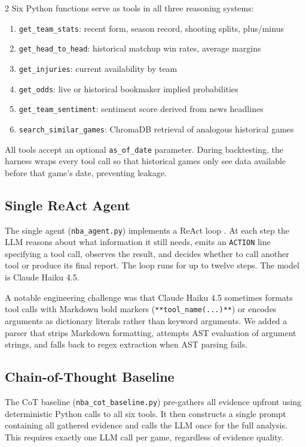 \documentclass[11pt]{article}
\begin{document}
\begin{multicols}{2}
Six Python functions serve as tools in all three reasoning systems:

\begin{enumerate}[leftmargin=*]
    \item \texttt{get\_team\_stats}: recent form, season record, shooting splits, plus/minus
    \item \texttt{get\_head\_to\_head}: historical matchup win rates, average margins
    \item \texttt{get\_injuries}: current availability by team
    \item \texttt{get\_odds}: live or historical bookmaker implied probabilities
    \item \texttt{get\_team\_sentiment}: sentiment score derived from news headlines
    \item \texttt{search\_similar\_games}: ChromaDB retrieval of analogous historical games
\end{enumerate}

All tools accept an optional \texttt{as\_of\_date} parameter. During backtesting, the harness wraps every tool call so that historical games only see data available before that game's date, preventing leakage.

\subsection{Single ReAct Agent}

The single agent (\texttt{nba\_agent.py}) implements a ReAct loop \citep{yao2023}. At each step the LLM reasons about what information it still needs, emits an \texttt{ACTION} line specifying a tool call, observes the result, and decides whether to call another tool or produce its final report. The loop runs for up to twelve steps. The model is Claude Haiku 4.5.

A notable engineering challenge was that Claude Haiku 4.5 sometimes formats tool calls with Markdown bold markers (\texttt{**tool\_name(...)**}) or encodes arguments as dictionary literals rather than keyword arguments. We added a parser that strips Markdown formatting, attempts AST evaluation of argument strings, and falls back to regex extraction when AST parsing fails.

\subsection{Chain-of-Thought Baseline}

The CoT baseline (\texttt{nba\_cot\_baseline.py}) pre-gathers all evidence upfront using deterministic Python calls to all six tools. It then constructs a single prompt containing all gathered evidence and calls the LLM once for the full analysis. This requires exactly one LLM call per game, regardless of evidence quality.


\end{multicols}
\end{document}
